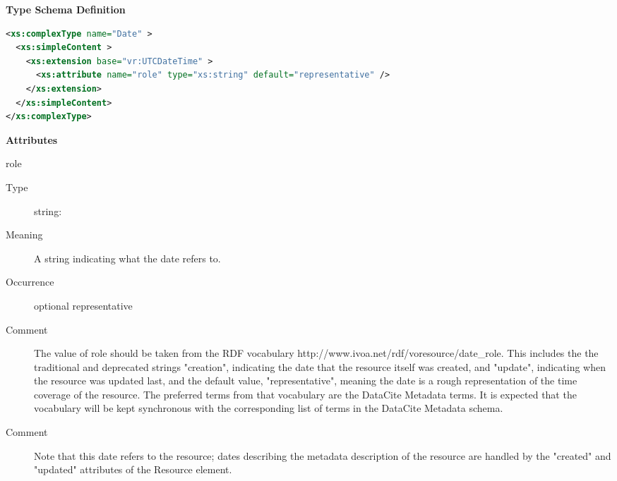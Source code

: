 \documentclass[11pt,a4paper]{ivoa}
\begin{document}
\begin{generated}
\begingroup
      	\renewcommand*\descriptionlabel[1]{%
      	\hbox to 5.5em{\emph{#1}\hfil}}\vspace{1ex}\noindent\textbf{ Type Schema Definition}

\begin{lstlisting}[language=XML,basicstyle=\footnotesize]
<xs:complexType name="Date" >
  <xs:simpleContent >
    <xs:extension base="vr:UTCDateTime" >
      <xs:attribute name="role" type="xs:string" default="representative" />
    </xs:extension>
  </xs:simpleContent>
</xs:complexType>
\end{lstlisting}

\vspace{0.5ex}\noindent\textbf{ Attributes}

\begingroup\small\begin{bigdescription}
\item[role]
\begin{description}
\item[Type] string: 
\item[Meaning] 
                 A string indicating what the date refers to.  
               
\item[Occurrence] optional
representative
\item[Comment] 
               	The value of role should be taken from the RDF vocabulary
               	http://www.ivoa.net/rdf/voresource/date\_role.
               	This includes the the traditional and deprecated strings
                {"}creation{"}, indicating the date that the resource 
                itself was created, and {"}update{"}, indicating when the
                resource was updated last, and the default value,
                {"}representative{"}, meaning the date is a rough 
                representation of the time coverage of the resource.
                The preferred terms from that vocabulary are the DataCite
                Metadata terms.   It is expected that the vocabulary will 
                be kept synchronous with the corresponding list of terms
                in the DataCite Metadata schema.
               
\item[Comment] 
                 Note that this date refers to the resource; dates describing
                 the metadata description of the resource are handled by
                 the {"}created{"} and {"}updated{"} attributes of the Resource 
                 element. 
               
\end{description}


\end{bigdescription}\endgroup

\endgroup
\end{generated}
\end{document}
